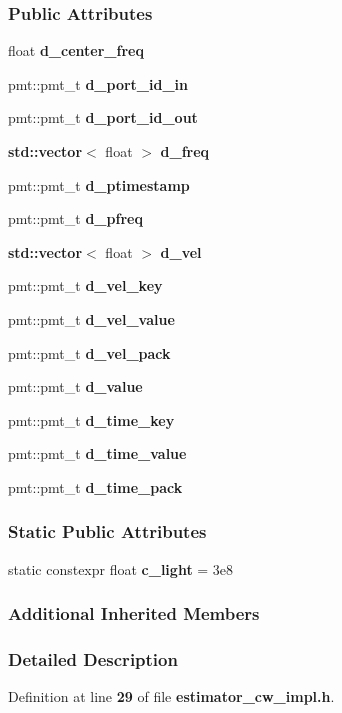 \subsubsection*{Public Attributes}
\begin{DoxyCompactItemize}
\item 
float {\bf d\+\_\+center\+\_\+freq}
\item 
pmt\+::pmt\+\_\+t {\bf d\+\_\+port\+\_\+id\+\_\+in}
\item 
pmt\+::pmt\+\_\+t {\bf d\+\_\+port\+\_\+id\+\_\+out}
\item 
{\bf std\+::vector}$<$ float $>$ {\bf d\+\_\+freq}
\item 
pmt\+::pmt\+\_\+t {\bf d\+\_\+ptimestamp}
\item 
pmt\+::pmt\+\_\+t {\bf d\+\_\+pfreq}
\item 
{\bf std\+::vector}$<$ float $>$ {\bf d\+\_\+vel}
\item 
pmt\+::pmt\+\_\+t {\bf d\+\_\+vel\+\_\+key}
\item 
pmt\+::pmt\+\_\+t {\bf d\+\_\+vel\+\_\+value}
\item 
pmt\+::pmt\+\_\+t {\bf d\+\_\+vel\+\_\+pack}
\item 
pmt\+::pmt\+\_\+t {\bf d\+\_\+value}
\item 
pmt\+::pmt\+\_\+t {\bf d\+\_\+time\+\_\+key}
\item 
pmt\+::pmt\+\_\+t {\bf d\+\_\+time\+\_\+value}
\item 
pmt\+::pmt\+\_\+t {\bf d\+\_\+time\+\_\+pack}
\end{DoxyCompactItemize}
\subsubsection*{Static Public Attributes}
\begin{DoxyCompactItemize}
\item 
static constexpr float {\bf c\+\_\+light} = 3e8
\end{DoxyCompactItemize}
\subsubsection*{Additional Inherited Members}


\subsubsection{Detailed Description}


Definition at line {\bf 29} of file {\bf estimator\+\_\+cw\+\_\+impl.\+h}.



